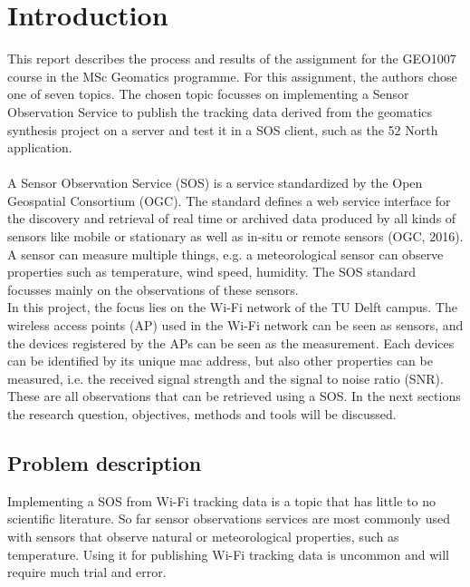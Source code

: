 \chapter{Introduction}
This report describes the process and results of the assignment for the GEO1007 course in the MSc Geomatics programme. For this assignment, the authors chose one of seven topics. The chosen topic focusses on implementing a Sensor Observation Service to publish the tracking data derived from the geomatics synthesis project on a server and test it in a SOS client, such as the 52 North application. \\\\
A Sensor Observation Service (SOS) is a service standardized by the Open Geospatial Consortium (OGC). The standard defines a web service interface for the discovery and retrieval of real time or archived data produced by all kinds of sensors like mobile or stationary as well as in-situ or remote sensors (OGC, 2016). A sensor can measure multiple things, e.g. a meteorological sensor can observe properties such as temperature, wind speed, humidity. The SOS standard focusses mainly on the observations of these sensors. \\
In this project, the focus lies on the Wi-Fi network of the TU Delft campus. The wireless access points (AP) used in the Wi-Fi network can be seen as sensors, and the devices registered by the APs can be seen as the measurement. Each devices can be identified by its unique mac address, but also other properties can be measured, i.e. the received signal strength and the signal to noise ratio (SNR). These are all observations that can be retrieved using a SOS. In the next sections the research question, objectives, methods and tools will be discussed.

\section{Problem description}
Implementing a SOS from Wi-Fi tracking data is a topic that has little to no scientific literature. So far sensor observations services are most commonly used with sensors that observe natural or meteorological properties, such as temperature. Using it for publishing Wi-Fi tracking data is uncommon and will require much trial and error.

